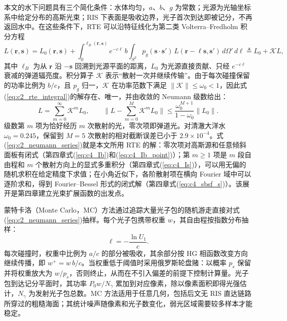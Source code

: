本文的水下问题具有三个简化条件：水体均匀，$a$、$b$、$g$ 为常数；光源为光轴坐标系中给定分布的高斯光束；RIS 下表面是吸收边界，光子首次到达即被记分，不再返回水中。在这些条件下，RTE 可以沿特征线化为第二类 Volterra--Fredholm 积分方程
\begin{equation}
L(\mathbf r,\mathbf s)=L_0(\mathbf r,\mathbf s)
+\int_0^{\ell_B(\mathbf r,\mathbf s)}e^{-c\ell}\,b\int_{S^2}p_g(\mathbf s\cdot\mathbf s')\,L(\mathbf r-\ell\mathbf s,\mathbf s')\,d\Omega'\,d\ell
\triangleq L_0+\mathcal K L,
\label{eq:c2_rte_integral}
\end{equation}
其中 $\ell_B$ 为从 $\mathbf r$ 沿 $-\mathbf s$ 回溯到光源平面的距离，$L_0$ 为光源直接贡献、只经 $e^{-c\ell}$ 衰减的弹道辐亮度。积分算子 $\mathcal K$ 表示“散射一次并继续传输”。由于每次碰撞保留的功率比例为 $b/c$，且 $p_g$ 归一，$\mathcal K$ 在功率范数下满足 $\|\mathcal K\|\le\omega_0<1$，因此式(\ref{eq:c2_rte_integral})的解存在、唯一，并由收敛的 Neumann 级数给出：
\begin{equation}
L=\sum_{m=0}^{\infty}\mathcal K^mL_0,\qquad
\Big\|L-\sum_{m=0}^{M}\mathcal K^mL_0\Big\|\le\frac{\omega_0^{M+1}}{1-\omega_0}\|L_0\|.
\label{eq:c2_neumann_series}
\end{equation}
级数第 $m$ 项为恰好经历 $m$ 次散射的光，零次项即弹道光。对清澈大洋水 $\omega_0=0.245$，保留到 $M=5$ 次散射的相对截断误差已小于 $2.9\times10^{-4}$。式(\ref{eq:c2_neumann_series})就是本文所用 RTE 的解：零次项对高斯源和任意倾斜面板有闭式（第四章式(\ref{eq:c4_Ib})和(\ref{eq:c4_Ib_point})）；第 $m\ge1$ 项是 $m$ 段自由程和 $m$ 个散射方向上的显式多重积分（第四章式(\ref{eq:c4_Is})），可以用无偏的随机求积在给定精度下求值；在小角近似下，各阶散射项在横向 Fourier 域中可以逐阶求和，得到 Fourier--Bessel 形式的闭式解（第四章式(\ref{eq:c4_sbsf_s})）。该展开是第四章建立光束扩展函数的出发点。

蒙特卡洛（Monte Carlo，MC）方法通过追踪大量光子包的随机游走直接对式(\ref{eq:c2_neumann_series})抽样。每个光子包携带权重 $w$，其自由程按指数分布抽样：
\begin{equation}
\ell=-\frac{\ln U_1}{c}.
\label{eq:c2_freepath}
\end{equation}
每次碰撞时，权重中比例为 $a/c$ 的部分被吸收，其余部分按 HG 相函数改变方向继续传播，即 $w^+=w\,b/c$。当权重低于阈值时采用俄罗斯轮盘赌：以概率 $p_s$ 保留并将权重放大为 $w/p_s$，否则终止，从而在不引入偏差的前提下控制计算量。光子包到达记分平面时，其功率 $P_0w/N_\gamma$ 累加到对应像素，除以像素面积即得光强估计，$N_\gamma$ 为发射光子包总数。MC 方法适用于任意几何，包括后文无 RIS 直达链路所穿过的粗糙海面；其统计噪声随像素和光子数变化，弱光区域需要较多样本才能稳定。

